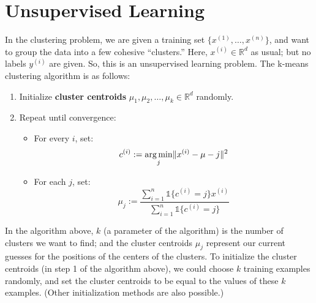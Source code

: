 \titlespacing*{\part}{0pt}{-20pt}{30pt} %
\titlespacing*{\chapter}{0pt}{-10pt}{30pt}

\part{Unsupervised Learning}
\label{part:unsupervised_learning}


\vspace{1cm}
\label{cha:k_means}
In the clustering problem, we are given a training set $\{x^{(1)} ,\ldots,x^{(n)}\}$, and
want to group the data into a few cohesive ``clusters.'' Here, $x^{(i)} \in \mathbb R^d$
as usual; but no labels $y^{(i)}$ are given. So, this is an unsupervised learning
problem.
The k-means clustering algorithm is as follows:
\begin{enumerate}
    \item Initialize \textbf{cluster centroids} $\mu_1 ,\mu_2 ,\ldots,\mu_k \in \mathbb R^d$ randomly.
    \item Repeat until convergence:
    \begin{itemize}
        \item For every $i$, set:
        \begin{equation*}
            c^{(i)} := \argmin_j \lVert x^{(i)} - \mu-j \rVert^2
        \end{equation*}
        \item For each $j$, set:
        \begin{equation*}
            \mu_j := \frac{\sum^n_{i=1} \mathbb{1}\{c^{(i)} = j\}x^{(i)}}{\sum^n_{i=1} \mathbb{1}\{c^{(i)} = j\}}
        \end{equation*}
    \end{itemize}
\end{enumerate}

In the algorithm above, $k$ (a parameter of the algorithm) is the number
of clusters we want to find; and the cluster centroids $\mu_j$ represent our current
guesses for the positions of the centers of the clusters. To initialize the cluster
centroids (in step 1 of the algorithm above), we could choose $k$ training
examples randomly, and set the cluster centroids to be equal to the values of
these $k$ examples. (Other initialization methods are also possible.)

